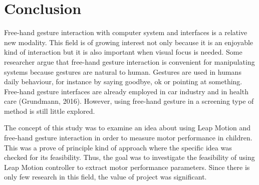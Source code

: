 \chapter{Conclusion}
\label{chap:conclusion}




Free-hand gesture interaction with computer system and interfaces is a relative new modality. This field is of growing interest not only because it is an enjoyable kind of interaction but it is also important when visual focus is needed. Some researcher argue that free-hand gesture interaction is convenient for manipulating systems because gestures are natural to human. Gestures are used in humans daily behaviour, for instance by saying goodbye, ok or pointing at something. 
Free-hand gesture interfaces are already employed in car industry and in health care (Grundmann, 2016). However, using free-hand gesture in a screening type of method is still little explored.

The concept of this study was to examine an idea about using Leap Motion and free-hand gesture interaction in order to measure motor performance in children. This was a prove of principle kind of approach where the specific idea was checked for its feasibility. Thus, the goal was to investigate the feasibility of using Leap Motion controller to extract motor performance parameters. Since there is only few research in this field, the value of project was significant.

